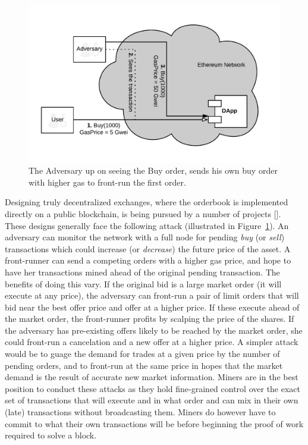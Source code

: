 \begin{figure}[t]
\centering
\includegraphics[width=0.7\linewidth]{figures/Regular_frontrunning.png}
\caption{\scriptsize The Adversary up on seeing the Buy order, sends his own buy order with higher gas to front-run the first order. \label{fig:RegularFrontrunning}} 
\end{figure}


Designing truly decentralized exchanges, where the orderbook is implemented directly on a public blockchain, is being pursued by a number of projects []. These designs generally face the following attack (illustrated in Figure~\ref{fig:RegularFrontrunning}). An adversary can monitor the network with a full node for pending \textit{buy} (or \textit{sell}) transactions which could increase (or \textit{decrease}) the future price of the asset. A front-runner can send a competing orders with a higher gas price, and hope to have her transactions mined ahead of the original pending transaction. The benefits of doing this vary. If the original bid is a large market order (\ie it will execute at any price), the adversary can front-run a pair of limit orders that will bid near the best offer price and offer at a higher price. If these execute ahead of the market order, the front-runner profits by scalping the price of the shares. If the adversary has pre-existing offers likely to be reached by the market order, she could front-run a cancelation and a new offer at a higher price. A simpler attack would be to guage the demand for trades at a given price by the number of pending orders, and to front-run at the same price in hopes that the market demand is the result of accurate new market information. Miners are in the best position to conduct these attacks as they hold fine-grained control over the exact set of transactions that will execute and in what order and can mix in their own (late) transactions without broadcasting them. Miners do however have to commit to what their own transactions will be before beginning the proof of work required to solve a block. 

